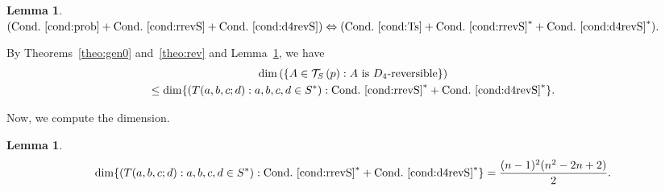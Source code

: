 \documentclass[10pt]{amsart}
\newtheorem{lemm}[theo]{Lemma}\newtheorem{prop}[theo]{Proposition}\newtheorem{coro}[theo]{Corollary}\newtheorem{conj}[theo]{Conjecture}
\theoremstyle{definition}\newtheorem{defi}[theo]{Definition}\newtheorem{rema}[theo]{Remark}\newtheorem{exam}[theo]{Example}\newtheorem{exem}[theo]{Example}\newtheorem{nota}[theo]{Notation}
\newcounter{a}
\newcommand{\Cond}{Cond.}
\newcommand{\triang}[2]{\mathcal{T}_{#1} \left(#2 \right)}
\begin{document}
\begin{lemm}\label{lem:equiv-7}
$(\text{\Cond}~\ref{cond:prob} + \text{\Cond}~\ref{cond:rrevS} + \text{\Cond}~\ref{cond:d4revS}) \Leftrightarrow (\text{\Cond}~\ref{cond:Ts} + \text{\Cond}~\ref{cond:rrevS}^* + \text{\Cond}~\ref{cond:d4revS}^*).$
\end{lemm}

By Theorems~\ref{theo:gen0} and~\ref{theo:rev} and Lemma~\ref{lem:equiv-7}, we have
\begin{multline*}
\dim \left(\{A \in \triang{S}{p} : \text{$A$ is $D_4$-reversible}\} \right) \\
\leq \dim \{(T(a,b,c;d) : a,b,c,d \in S^*) : \text{\Cond}~\ref{cond:rrevS}^*+ \text{\Cond}~\ref{cond:d4revS}^*\}.
\end{multline*}

Now, we compute the dimension.

\begin{lemm}
\begin{equation*}
\dim \{(T(a,b,c;d) : a,b,c,d \in S^*) : \text{\Cond}~\ref{cond:rrevS}^* + \text{\Cond}~\ref{cond:d4revS}^*\} = \frac{(n-1)^2 (n^2-2n+2)}{2}.
\end{equation*}
\end{lemm}
\end{document}
